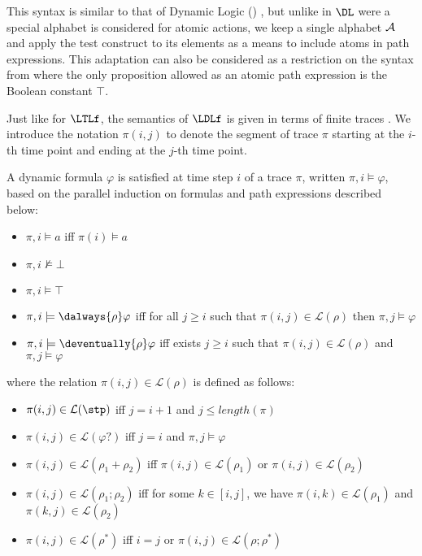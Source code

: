 This syntax is similar to that of Dynamic Logic (\DL) \cite{hatiko00a}, but unlike in $\DL$ were a special alphabet is considered for atomic actions, we keep a single alphabet $\mathcal{A }$ and apply the test construct to its elements as a means to include atoms in path expressions. This adaptation can also be considered as a restriction on the syntax from \cite{giavar15a} where the only proposition allowed as an atomic path expression is the Boolean constant $\top$.   


Just like for $\LTLf$, the semantics of $\LDLf$ is given in terms of finite traces \cite{giavar15a}. We introduce the notation $\pi (i,j)$ to denote the segment of trace $\pi$ starting at the $i$-th time point and ending at the $j$-th time point. 

\begin{definition}[Semantics]
    A dynamic formula $\varphi$ is satisfied at time step $i$ of a trace $\pi$, written $\pi,i \models\varphi$, based on the parallel induction on formulas and path expressions described below:
\begin{itemize}
\item $\pi,i\models a$ iff $\pi(i)\models a$
\item $\pi,i \not\models\bot$
\item $\pi,i \models\top$ 
\item $\pi,i \models\dalways{\rho}\varphi$ iff for all $j\geq i$ such that $\pi(i,j)\in\mathcal{L}(\rho)$ then $\pi,j\models\varphi$
\item $\pi,i \models\deventually{\rho}\varphi$ iff exists $j\geq i$ such that $\pi(i,j)\in\mathcal{L}(\rho)$ and $\pi,j\models\varphi$
\end{itemize}
    where the relation $\pi (i,j) \in \mathcal{L}(\rho)$ is defined as follows:
\begin{itemize}
\item $\pi(i,j)\in\mathcal{L}(\stp)$ iff $j=i+1$ and $j\leq length(\pi)$
\item $\pi(i,j)\in\mathcal{L}(\varphi ?)$ iff $j=i$ and $\pi,j\models\varphi$
\item $\pi(i,j)\in\mathcal{L}(\rho_1 + \rho_2)$ iff $\pi(i,j)\in\mathcal{L}(\rho_1)$ or $\pi(i,j)\in\mathcal{L}(\rho_2)$
\item $\pi(i,j)\in\mathcal{L}(\rho_1 ; \rho_2)$ iff
for some $k\in [i, j]$, we have $\pi(i,k)\in\mathcal{L}(\rho_1)$ and $\pi(k,j)\in\mathcal{L}(\rho_2)$
\item $\pi(i,j)\in\mathcal{L}(\rho^{\ast})$ iff $i=j$ or $\pi(i,j)\in\mathcal{L}(\rho ; \rho^{\ast})$
\end{itemize}
\end{definition}


